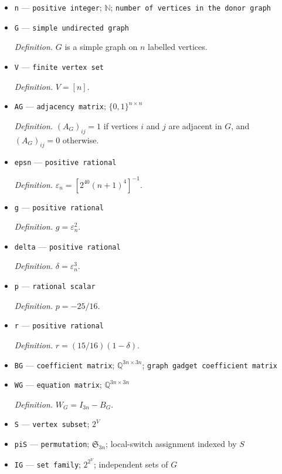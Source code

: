 \documentclass{article}
\begin{document}
\begin{itemize}
  \item \texttt{n} --- \texttt{positive integer}; \(\mathbb N\); \texttt{number of vertices in the donor graph}
  \item \texttt{G} --- \texttt{simple undirected graph}
  \par\smallskip\noindent\emph{Definition.} \(G\) is a simple graph on \(n\) labelled vertices.
  \item \texttt{V} --- \texttt{finite vertex set}
  \par\smallskip\noindent\emph{Definition.} \(V=[n]\).
  \item \texttt{AG} --- \texttt{adjacency matrix}; \(\{0,1\}^{n\times n}\)
  \par\smallskip\noindent\emph{Definition.} \((A_G)_{ij}=1\) if vertices \(i\) and \(j\) are adjacent in \(G\), and \((A_G)_{ij}=0\) otherwise.
  \item \texttt{epsn} --- \texttt{positive rational}
  \par\smallskip\noindent\emph{Definition.} \(\varepsilon_n=[2^{40}(n+1)^4]^{-1}\).
  \item \texttt{g} --- \texttt{positive rational}
  \par\smallskip\noindent\emph{Definition.} \(g=\varepsilon_n^2\).
  \item \texttt{delta} --- \texttt{positive rational}
  \par\smallskip\noindent\emph{Definition.} \(\delta=\varepsilon_n^3\).
  \item \texttt{p} --- \texttt{rational scalar}
  \par\smallskip\noindent\emph{Definition.} \(p=-25/16\).
  \item \texttt{r} --- \texttt{positive rational}
  \par\smallskip\noindent\emph{Definition.} \(r=(15/16)(1-\delta)\).
  \item \texttt{BG} --- \texttt{coefficient matrix}; \(\mathbb Q^{3n\times3n}\); \texttt{graph gadget coefficient matrix}
  \item \texttt{WG} --- \texttt{equation matrix}; \(\mathbb Q^{3n\times3n}\)
  \par\smallskip\noindent\emph{Definition.} \(W_G=I_{3n}-B_G\).
  \item \texttt{S} --- \texttt{vertex subset}; \(2^V\)
  \item \texttt{piS} --- \texttt{permutation}; \(\mathfrak S_{3n}\); local-switch assignment indexed by \(S\)
  \item \texttt{IG} --- \texttt{set family}; \(2^{2^V}\); independent sets of \(G\)

\end{itemize}
\end{document}

